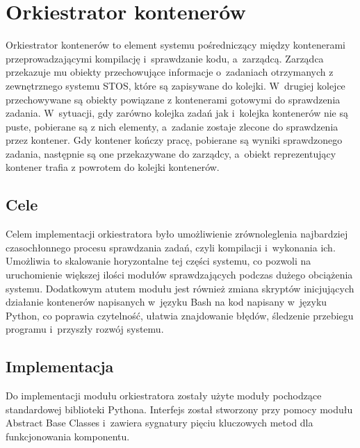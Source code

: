 \section{Orkiestrator kontenerów}
Orkiestrator kontenerów to element systemu pośredniczący między kontenerami przeprowadzającymi kompilację i~sprawdzanie kodu, a~zarządcą. Zarządca przekazuje mu obiekty przechowujące informacje o~zadaniach otrzymanych z zewnętrznego systemu STOS, które są zapisywane do kolejki. W~drugiej kolejce przechowywane są obiekty powiązane z kontenerami gotowymi do sprawdzenia zadania. W~sytuacji, gdy zarówno kolejka zadań jak i~kolejka kontenerów nie są puste, pobierane są z nich elementy, a~zadanie zostaje zlecone do sprawdzenia przez kontener. Gdy kontener kończy pracę, pobierane są wyniki sprawdzonego zadania, następnie są one przekazywane do zarządcy, a~obiekt reprezentujący kontener trafia z powrotem do kolejki kontenerów.

\subsection{Cele}
Celem implementacji orkiestratora było umożliwienie zrównoleglenia najbardziej czasochłonnego procesu sprawdzania zadań, czyli kompilacji i~wykonania ich. Umożliwia to skalowanie horyzontalne tej części systemu, co pozwoli na uruchomienie większej ilości modułów sprawdzających podczas dużego obciążenia systemu. Dodatkowym atutem modułu jest również zmiana skryptów inicjujących działanie kontenerów napisanych w~języku Bash na kod napisany w~języku Python, co poprawia czytelność, ułatwia znajdowanie błędów, śledzenie przebiegu programu i~przyszły rozwój systemu.

\subsection{Implementacja}
Do implementacji modułu orkiestratora zostały użyte moduły pochodzące standardowej biblioteki Pythona. Interfejs został stworzony przy pomocy modułu Abstract Base Classes\cite{pythonAbc} i~zawiera sygnatury pięciu kluczowych metod dla funkcjonowania komponentu. 

